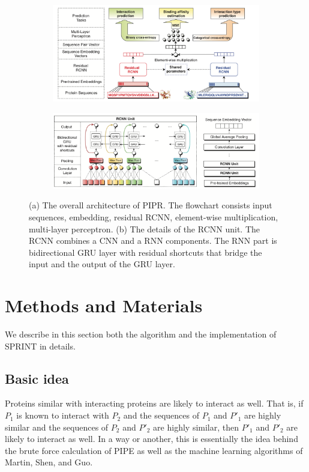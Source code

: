 \begin{figure}[h!]
\centering
\begin{subfigure}[b]{\textwidth}
   \includegraphics[width = 17cm]{img/PIPR_archi.png}
   \caption{}
   \label{fig_Ng1} 
\end{subfigure}

\begin{subfigure}[b]{\textwidth}
   \includegraphics[width = 17cm]{img/PIPR.png}
   \caption{}
   \label{fig_PIPR}
\end{subfigure}

\caption[The architecture of PIPR]{(a) The overall architecture of PIPR. The flowchart consists input sequences, embedding, residual RCNN, element-wise multiplication, multi-layer perceptron. (b) The details of the RCNN unit. The RCNN combines a CNN and a RNN components. The RNN part is bidirectional GRU layer with residual shortcuts that bridge the input and the output of the GRU layer.}
\end{figure}

\section{Methods and Materials}
We describe in this section both the algorithm and the implementation of SPRINT in details.
\subsection{Basic idea}
Proteins similar with interacting proteins are likely to interact as well. That is, if $P_1$ is known to interact with $P_2$ and the sequences of $P_1$ and $P'_1$ are highly similar and the sequences of $P_2$ and $P'_2$ are highly similar, then $P'_1$ and $P'_2$ are likely to interact as well. In a way or another, this is essentially the idea behind the brute force calculation of PIPE as well as the machine learning algorithms of Martin, Shen, and Guo. 

